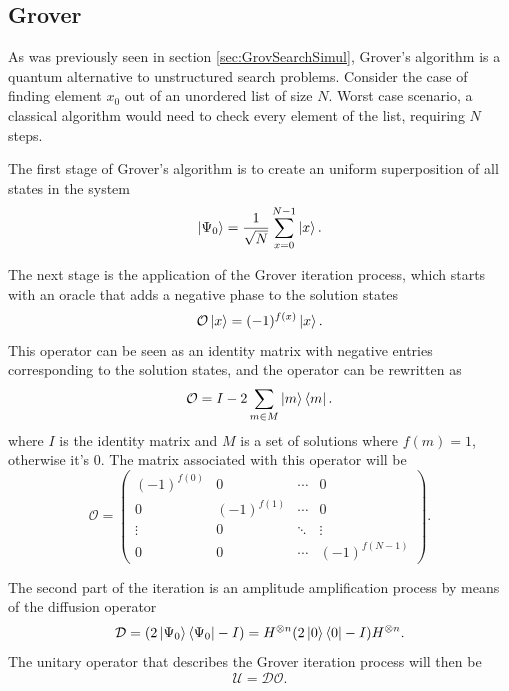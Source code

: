 \documentclass[../../dissertation.tex]{subfiles}
\begin{document}
\subsection{Grover}
As was previously seen in section \ref{sec:GrovSearchSimul}, Grover's algorithm
is a quantum alternative to unstructured search problems. Consider the case of
finding element $x_0$ out of an unordered list of size $N$. Worst case
scenario, a classical algorithm would need to check every element of the list,
requiring $N$ steps.\par

The first stage of Grover's algorithm is to create an uniform superposition of
all states in the system
\begin{equation}
	\ket{\Psi_0}  = \frac{1}{\sqrt{N}}\sum_{x=0}^{N-1} \ket{x}.
\end{equation}\par
The next stage is the application of the Grover iteration process, which starts
with an oracle that adds a negative phase to the solution states
\begin{equation}
        \mathcal{O}\ket{x} = (-1)^{f(x)}\ket{x}.
\end{equation}
This operator can be seen as an identity matrix with negative entries
corresponding to the solution states, and the operator can be rewritten as 
\begin{equation}
	\mathcal{O} = I - 2\sum_{m\in M} \ket{m}\bra{m}.
	\label{eq:groverQiskitOracle}
\end{equation}
where $I$ is the identity matrix and $M$ is a set of solutions where $f(m) =
1$, otherwise it's $0$. The matrix associated with this operator will be
\begin{equation}
	\mathcal{O} = 
	\begin{pmatrix}
		(-1)^{f(0)} & 0 & \cdots & 0\\
	        0 & (-1)^{f(1)} & \cdots & 0\\ 
	        \vdots & 0 &  \ddots & \vdots\\ 
		0 & 0 & \cdots &  (-1)^{f(N-1)}
	\end{pmatrix}.
	\label{eq:oracleMatrixQiskit}
\end{equation}\par
The second part of the iteration is an amplitude amplification process by means
of the diffusion operator 
\begin{equation}
        \mathcal{D} = (2\ket{\Psi_0}\bra{\Psi_0} - I) = H^{\otimes n}(2\ket{0}\bra{0} - I)H^{\otimes n}.
	\label{eq:groverQiskitDiffusion}
\end{equation}
The unitary operator that describes the Grover iteration process will then be
\begin{equation}
        \mathcal{U} = \mathcal{D}\mathcal{O}.
\end{equation}\par
\end{document}

